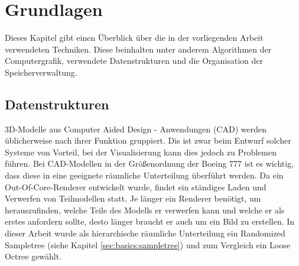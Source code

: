 \chapter{Grundlagen}
\label{chap:basics}
%
Dieses Kapitel gibt einen Überblick über die in der vorliegenden Arbeit verwendeten Techniken. Diese beinhalten unter anderem Algorithmen der Computergrafik, verwendete Datenstrukturen und die Organisation der Speicherverwaltung.

\section{Datenstrukturen}
\label{sec:basics:datenstrukturen}
3D-Modelle aus Computer Aided Design - Anwendungen (CAD) werden üblicherweise nach ihrer Funktion gruppiert. Dis ist zwar beim Entwurf solcher Systeme von Vorteil, bei der Visualisierung kann dies jedoch zu Problemen führen. Bei CAD-Modellen in der Größenordnung der Boeing 777 ist es wichtig, dass diese in eine geeignete räumliche Unterteilung überführt werden. Da ein Out-Of-Core-Renderer entwickelt wurde, findet ein ständiges Laden und Verwerfen von Teilmodellen statt. Je länger ein Renderer benötigt, um herauszufinden, welche Teile des Modells er verwerfen kann und welche er als erstes anfordern sollte, desto länger braucht er auch um ein Bild zu erstellen. In dieser Arbeit wurde als hierarchische räumliche Unterteilung ein Randomized Sampletree (siehe Kapitel \ref{sec:basics:sampletree}) und zum Vergleich ein Loose Octree gewählt.

